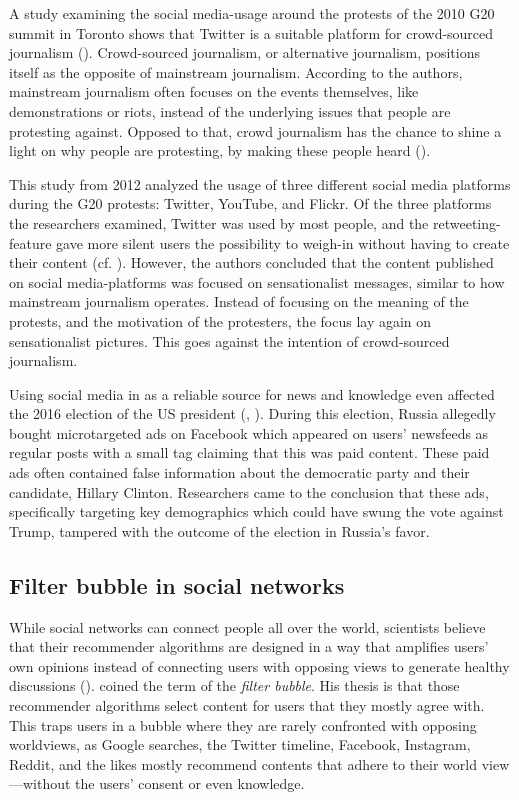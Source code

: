 A study examining the social media-usage around the protests of the 2010 G20 summit in Toronto shows that Twitter is a suitable platform for crowd-sourced journalism (\cite{poell2012twitter}). Crowd-sourced journalism, or alternative journalism, positions itself as the opposite of mainstream journalism. According to the authors, mainstream journalism often focuses on the events themselves, like demonstrations or riots, instead of the underlying issues that people are protesting against. Opposed to that, crowd journalism has the chance to shine a light on why people are protesting, by making these people heard (\cite[698]{poell2012twitter}). 

This study from 2012 analyzed the usage of three different social media platforms during the G20 protests: Twitter, YouTube, and Flickr. Of the three platforms the researchers examined, Twitter was used by most people, and the retweeting-feature gave more silent users the possibility to weigh-in without having to create their content (cf. \cite[709]{poell2012twitter}). However, the authors concluded that the content published on social media-platforms was focused on sensationalist messages, similar to how mainstream journalism operates. Instead of focusing on the meaning of the protests, and the motivation of the protesters, the focus lay again on sensationalist pictures. This goes against the intention of crowd-sourced journalism.

Using social media in as a reliable source for news and knowledge even affected the 2016 election of the US president (\cite{duttSenatorWeSell2018}, \cite{ribeiroMicrotargetingSociallyDivisive2019}). During this election, Russia allegedly bought microtargeted ads on Facebook which appeared on users' newsfeeds as regular posts with a small tag claiming that this was paid content. These paid ads often contained false information about the democratic party and their candidate, Hillary Clinton. Researchers came to the conclusion that these ads, specifically targeting key demographics which could have swung the vote against Trump, tampered with the outcome of the election in Russia's favor.

\subsection{Filter bubble in social networks}
While social networks can connect people all over the world, scientists believe that their recommender algorithms are designed in a way that amplifies users' own opinions instead of connecting users with opposing views to generate healthy discussions (\cite{pariser2011filter}). \citeauthor{pariser2011filter} coined the term of the \emph{filter bubble}. His thesis is that those recommender algorithms select content for users that they mostly agree with. This traps users in a bubble where they are rarely confronted with opposing worldviews, as Google searches, the Twitter timeline, Facebook, Instagram, Reddit, and the likes mostly recommend contents that adhere to their world view---without the users' consent or even knowledge.

